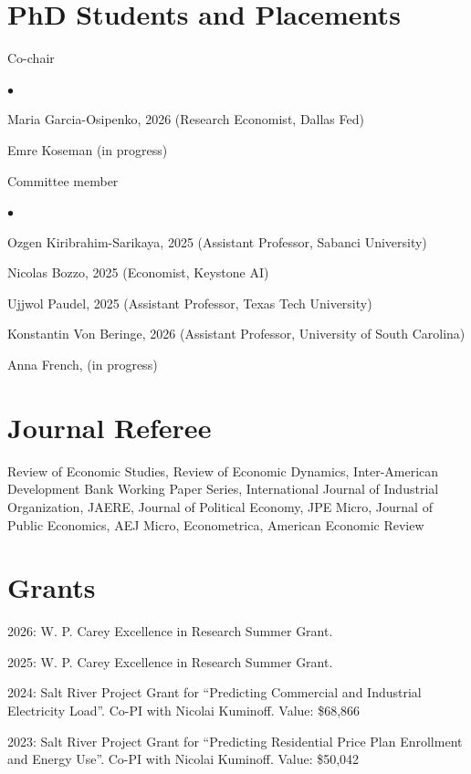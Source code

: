 \documentclass[margin,line]{res}
\newenvironment{list1}{
  \begin{list}{\ding{113}}{%
      \setlength{\itemsep}{.025in}
      \setlength{\parsep}{0in} \setlength{\parskip}{0in}
      \setlength{\topsep}{0in} \setlength{\partopsep}{0in}
      \setlength{\leftmargin}{0.17in}}}{\end{list}}
\newenvironment{list2}{
  \begin{list}{$\bullet$}{%
      \setlength{\itemsep}{0in}
      \setlength{\parsep}{0in} \setlength{\parskip}{0in}
      \setlength{\topsep}{0in} \setlength{\partopsep}{0in}
      \setlength{\leftmargin}{0.2in}}}{\end{list}}
\begin{document}
\begin{resume}
\section{PhD Students and Placements}
\begin{list1}
	\item[] Co-chair
	\begin{list2}
		\item[] Maria Garcia-Osipenko, 2026 (Research Economist, Dallas Fed)
		\item[] Emre Koseman (in progress)
	\end{list2}
    \item[] Committee member
	\begin{list2}
		\item[] Ozgen Kiribrahim-Sarikaya, 2025 (Assistant Professor, Sabanci University)
		\item[] Nicolas Bozzo, 2025 (Economist, Keystone AI)
        \item[] Ujjwol Paudel, 2025 (Assistant Professor, Texas Tech University)
        \item[] Konstantin Von Beringe, 2026 (Assistant Professor, University of South Carolina)
        \item[] Anna French, (in progress)
	\end{list2}
\end{list1}

\section{Journal Referee}
\begin{list1}
	\item[] Review of Economic Studies, Review of Economic Dynamics, Inter-American Development Bank Working Paper Series, International Journal of Industrial Organization, JAERE, Journal of Political Economy, JPE Micro, Journal of Public Economics, AEJ Micro, Econometrica, American Economic Review
\end{list1}

\section{Grants}
\begin{list1}
    \item[] 2026: W. P. Carey Excellence in Research Summer Grant.
    \item[] 2025: W. P. Carey Excellence in Research Summer Grant.
	\item[] 2024: Salt River Project Grant for ``Predicting Commercial and Industrial Electricity Load''. Co-PI with Nicolai Kuminoff. Value: \$68,866
	\item[] 2023: Salt River Project Grant for ``Predicting Residential Price Plan Enrollment and Energy Use''. Co-PI with Nicolai Kuminoff. Value: \$50,042
\end{list1}


\end{resume}
\end{document}
